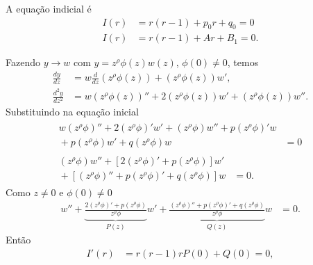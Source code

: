 \documentclass[a4paper,12pt, leqno, answers]{exam}
\begin{document}
\begin{questions}
\begin{solution}
        A equa\c{c}\~{a}o indicial \'{e}
        \begin{align*}
            I(r) &= r\left( r - 1 \right) + p_0 r + q_0 = 0 \\
            I(r) &= r\left( r - 1 \right) + A r + B_1 = 0.
        \end{align*}

        Fazendo $y \to w$ com $y = z^\rho \phi\left( z \right) w\left( z \right)$, $\phi\left( 0 \right) \neq 0$, temos
        \begin{align*}
            \frac{d y}{d z} &= w \frac{d}{d z}\left( z^\rho \phi\left( z \right) \right) + \left(z^\rho \phi \left(z\right)\right) w', \\
            \frac{d^2 y}{d z^2} &= w\left( z^\rho \phi\left( z \right) \right)'' + 2 \left( z^\rho \phi \left(z\right) \right) w' + \left( z^\rho \phi \left(z\right) \right) w''.
        \end{align*}
        Substituindo na equa\c{c}\~{a}o inicial
        \begin{align*}
            \begin{split}
                w \left( z^\rho \phi \right)'' + 2 \left( z^\rho \phi \right)' w' + \left( z^\rho \phi \right) w'' + p \left( z^\rho \phi \right)' w \\ {}+ p \left( z^\rho \phi \right) w' + q \left( z^\rho \phi \right) w &= 0
            \end{split} \\
            \begin{split}
                \left( z^\rho \phi \right) w'' + \left[ 2 \left( z^\rho \phi \right)' + p \left( z^\rho \phi \right) \right] w' \\ {}+ \left[ \left( z^\rho \phi \right)'' + p \left( z^\rho \phi \right)' + q \left( z^\rho \phi \right) \right] w &= 0.
            \end{split}
        \end{align*}
        Como $z \neq 0$ e $\phi(0) \neq 0$
        \begin{align*}
            w'' + \underbrace{\frac{2\left( z^\rho \phi \right)' + p \left( z^\rho \phi \right)}{z^\rho \phi}}_{P(z)} w' + \underbrace{\frac{\left( z^\rho \phi \right)'' + p \left( z^\rho \phi \right)' + q\left( z^\rho \phi \right)}{z^\rho \phi}}_{Q(z)} w &= 0.
        \end{align*}
        Ent\~{a}o
        \begin{align*}
            I'(r) &= r \left( r - 1 \right) r P(0) + Q(0) = 0, \\

\end{align*}
\end{solution}
\end{questions}
\end{document}
